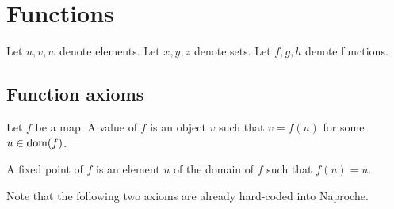 \documentclass[../../set-theory.ftl.tex]{subfiles}
\begin{document}
  \section{Functions}

  \begin{forthel}
  \end{forthel}

  \begin{forthel}
    Let $u,v,w$ denote elements.
    Let $x,y,z$ denote sets.
    Let $f,g,h$ denote functions.
  \end{forthel}


  \subsection{Function axioms}

  \begin{forthel}
    \begin{definition}
      Let $f$ be a map.
      A value of $f$ is an object $v$ such that $v = f(u)$ for some $u \in \operatorname{dom}(f)$.
    \end{definition}

    \begin{definition}
      A fixed point of $f$ is an element $u$ of the domain of $f$ such that $f(u) = u$.
    \end{definition}
  \end{forthel}

  Note that the following two axioms are already hard-coded into Naproche.
\end{document}
